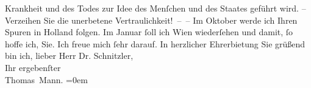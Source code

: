 \begin{ledgroupsized}[t]{13cm}
               Krankheit und des Todes zur Idee des Menſchen und des Staates geführt wird. –
               Verzeihen Sie die unerbetene Vertraulichkeit! – –\pend
           \pstart
           Im Oktober werde ich Ihren Spuren in Holland folgen. Im Januar{ }ſoll ich Wien
               wiederſehen und damit, ſo hoffe ich, Sie. Ich freue mich ſehr darauf.\pend
           \pstart
           In herzlicher Ehrerbietung Sie grüßend bin ich, lieber Herr Dr.
               Schnitzler,{\\[\baselineskip]}Ihr ergebenſter{\\[\baselineskip]}\spacefill\mbox{Thomas Mann.}\pend
           \leftskip=0em{}\endnumbering{}\end{ledgroupsized}  \newcommand{\dateiname}{L02392}\newcommand{\titel}{Thomas Mann an Arthur Schnitzler, 4. 9. 1922}\newcommand{\editorInnen}{Martin Anton Müller und Gerd-Hermann Susen}
      